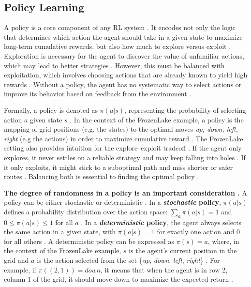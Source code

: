 \documentclass[final]{anthology-ch}         %
\begin{document}
\subsection{Policy Learning} \label{policy_learning}

A policy is a core component of any RL system \cite{Sutton1998}. It encodes not only the logic that determines which action the agent should take in a given state to maximize long-term cumulative rewards, but also how much to explore versus exploit \cite{Sutton1998, russell2016artificial}. Exploration is necessary for the agent to discover the value of unfamiliar actions, which may lead to better strategies \cite{russo2018tutorial}. However, this must be balanced with exploitation, which involves choosing actions that are already known to yield high rewards \cite{auer2002finite}. Without a policy, the agent has no systematic way to select actions or improve its behavior based on feedback from the environment \cite{Sutton1998}.

Formally, a policy is denoted as $\pi(a|s)$, representing the probability of selecting action $a$ given state $s$ \cite{Sutton1998, russell2016artificial}. In the context of the FrozenLake example, a policy is the mapping of grid positions (e.g. the states) to the optimal moves {\textit{up, down, left, right}} (e.g the actions) in order to maximize cumulative reward \cite{frozenlake}. The FrozenLake setting also provides intuition for the explore–exploit tradeoff \cite{frozenlake}. If the agent only explores, it never settles on a reliable strategy and may keep falling into holes \cite{Sutton1998}. If it only exploits, it might stick to a suboptimal path and miss shorter or safer routes \cite{russo2018tutorial}. Balancing both is essential to finding the optimal policy \cite{auer2002finite}.

\textbf{The degree of randomness in a policy is an important consideration \cite{Sutton1998}.} A policy can be either stochastic or deterministic \cite{Sutton1998}. In a \textbf{\textit{stochastic} policy}, $\pi(a|s)$ defines a probability distribution over the action space: $\sum_a \pi(a|s) = 1$ and $0 \leq \pi(a|s) \leq 1$ for all $a$ \cite{Sutton1998}. In a \textbf{\textit{deterministic} policy}, the agent always selects the same action in a given state, with $\pi(a|s) = 1$ for exactly one action and $0$ for all others \cite{puterman2014markov}. A deterministic policy can be expressed as $\pi(s) = a$, where, in the context of the FrozenLake example, $s$ is the agent’s current position in the grid and $a$ is the action selected from the set \{\textit{up}, \textit{down}, \textit{left}, \textit{right}\} \cite{frozenlake}. For example, if $\pi((2,1)) = \textit{down}$, it means that when the agent is in row 2, column 1 of the grid, it should move down to maximize the expected return \cite{FrozenLakeGymnasium2023}.
\end{document}
